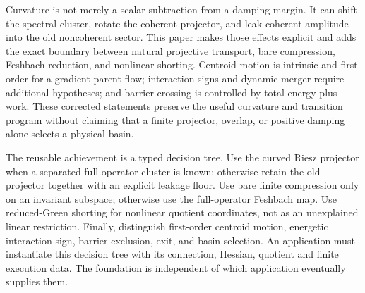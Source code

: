 \documentclass[11pt]{article}
\begin{document}
Curvature is not merely a scalar subtraction from a damping margin. It can
shift the spectral cluster, rotate the coherent projector, and leak coherent
amplitude into the old noncoherent sector. This paper makes those effects
explicit and adds the exact boundary between natural projective transport,
bare compression, Feshbach reduction, and nonlinear shorting. Centroid motion
is intrinsic and first order for a gradient parent flow; interaction signs and
dynamic merger require additional hypotheses; and barrier crossing is
controlled by total energy plus work. These corrected statements preserve the
useful curvature and transition program without claiming that a finite
projector, overlap, or positive damping alone selects a physical basin.

The reusable achievement is a typed decision tree.  Use the curved Riesz
projector when a separated full-operator cluster is known; otherwise retain
the old projector together with an explicit leakage floor.  Use bare finite
compression only on an invariant subspace; otherwise use the full-operator
Feshbach map.  Use reduced-Green shorting for nonlinear quotient coordinates,
not as an unexplained linear restriction. Finally, distinguish
first-order centroid motion, energetic interaction sign, barrier exclusion,
exit, and basin selection. An application must instantiate this decision tree
with its connection, Hessian, quotient and finite execution data. The
foundation is independent of which application eventually supplies them.
\end{document}

